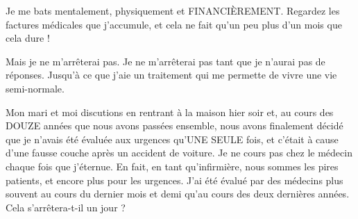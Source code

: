 Je me bats mentalement, physiquement et FINANCIÈREMENT. Regardez les factures
médicales que j'accumule, et cela ne fait qu'un peu plus d'un mois que cela dure
!

Mais je ne m'arrêterai pas. Je ne m'arrêterai pas tant que je n'aurai pas de
réponses. Jusqu'à ce que j'aie un traitement qui me permette de vivre une vie
semi-normale.

Mon mari et moi discutions en rentrant à la maison hier soir et, au cours des
DOUZE années que nous avons passées ensemble, nous avons finalement décidé que
je n'avais été évaluée aux urgences qu'UNE SEULE fois, et c'était à cause d'une
fausse couche après un accident de voiture. Je ne cours pas chez le médecin
chaque fois que j'éternue. En fait, en tant qu'infirmière, nous sommes les pires
patients, et encore plus pour les urgences. J'ai été évalué par des médecins
plus souvent au cours du dernier mois et demi qu'au cours des deux dernières
années. Cela s'arrêtera-t-il un jour ?
